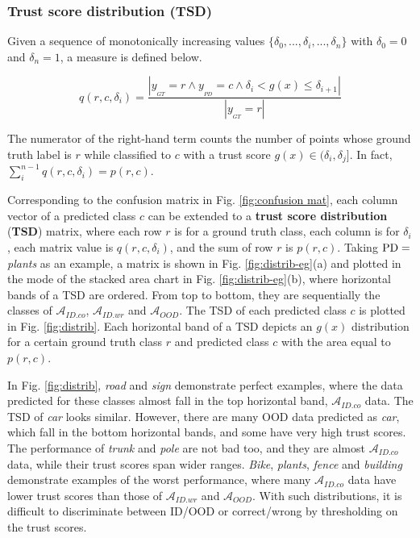 \documentclass[journal]{IEEEtran}
\begin{document}
\subsubsection{Trust score distribution (TSD)}

Given a sequence of monotonically increasing values $\{\delta_0,...,\delta_i,...,\delta_n\}$ with $\delta_0=0$ and $\delta_n=1$, a measure is defined below.

\begin{equation}
q(r,c,\delta_i) = \frac{|y_{_{GT}}=r \land y_{_{PD}}=c \land \delta_i<g(x) \le \delta_{i+1}|}{|y_{_{GT}}=r|}
\end{equation}

The numerator of the right-hand term counts the number of points whose ground truth label is $r$ while classified to $c$ with a trust score $g(x) \in (\delta_i,\delta_j]$.
In fact, $\sum_{i}^{n-1} q(r,c,\delta_i) = p(r,c)$.

Corresponding to the confusion matrix in Fig. \ref{fig:confusion mat}, each column vector of a predicted class $c$ can be extended to a \textbf{trust score distribution} (\textbf{TSD}) matrix, where each row $r$ is for a ground truth class, each column is for $\delta_i$, each matrix value is $q(r,c,\delta_i)$, and the sum of row $r$ is $p(r,c)$. Taking ${\rm PD}=$ \textit{plants} as an example, a matrix is shown in Fig. \ref{fig:distrib-eg}(a) and plotted in the mode of the stacked area chart in Fig. \ref{fig:distrib-eg}(b), where horizontal bands of a TSD are ordered. From top to bottom, they are sequentially the classes of $\mathcal{A}_{ID.co}$, $\mathcal{A}_{ID.wr}$ and $\mathcal{A}_{OOD}$.
The TSD of each predicted class $c$ is plotted in Fig. \ref{fig:distrib}.
Each horizontal band of a TSD depicts an $g(x)$ distribution for a certain ground truth class $r$ and predicted class $c$ with the area equal to $p(r,c)$.

In Fig. \ref{fig:distrib}, \textit{road} and \textit{sign} demonstrate perfect examples, where the data predicted for these classes almost fall in the top horizontal band, $\mathcal{A}_{ID.co}$ data.
The TSD of \textit{car} looks similar. However, there are many OOD data predicted as \textit{car}, which fall in the bottom horizontal bands, and some have very high trust scores.
The performance of \textit{trunk} and \textit{pole} are not bad too, and they are almost $\mathcal{A}_{ID.co}$ data, while their trust scores span wider ranges.
\textit{Bike}, \textit{plants}, \textit{fence} and \textit{building} demonstrate examples of the worst performance, where many $\mathcal{A}_{ID.co}$ data have lower trust scores than those of $\mathcal{A}_{ID.wr}$ and $\mathcal{A}_{OOD}$. With such distributions, it is difficult to discriminate between ID/OOD or correct/wrong by thresholding on the trust scores.
\end{document}
